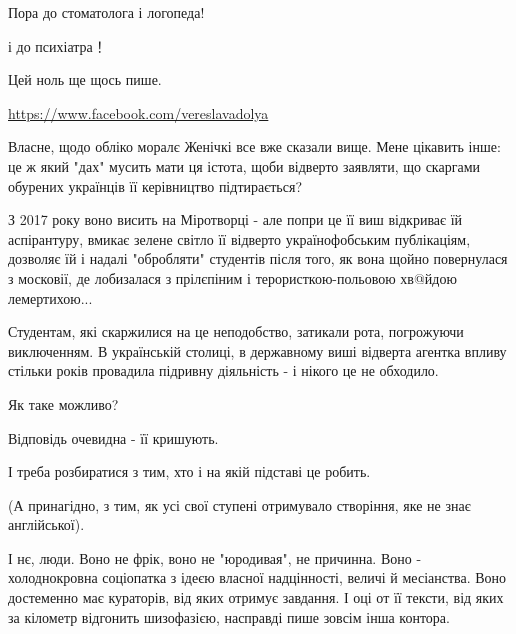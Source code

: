 \begin{itemize}

Пора до стоматолога і логопеда!

\begin{itemize}

і до психіатра！
\end{itemize}


Цей ноль ще щось пише.

\url{https://www.facebook.com/vereslavadolya}\par

Власне, щодо обліко моралє Женічкі все вже сказали вище. Мене цікавить інше: це
ж який "дах" мусить мати ця істота, щоби відверто заявляти, що скаргами
обурених українців її керівництво підтирається? 

З 2017 року воно висить на Міротворці - але попри це її виш відкриває їй
аспірантуру, вмикає зелене світло її відверто українофобським публікаціям,
дозволяє їй і надалі "обробляти" студентів після того, як вона щойно
повернулася з московії, де лобизалася з прілєпіним і терористкою-польовою
хв@йдою лемертихою... 

Студентам, які скаржилися на це неподобство, затикали рота, погрожуючи
виключенням. В українській столиці, в державному виші відверта агентка впливу
стільки років провадила підривну діяльність - і нікого це не обходило.

Як таке можливо?

Відповідь очевидна - її кришують.

І треба розбиратися з тим, хто і на якій підставі це робить.

(А принагідно, з тим, як усі свої ступені отримувало створіння, яке не знає англійської).

І нє, люди. Воно не фрік, воно не "юродивая", не причинна. Воно - холоднокровна
соціопатка з ідеєю власної надцінності, величі й месіанства. Воно достеменно
має кураторів, від яких отримує завдання. І оці от її тексти, від яких за
кілометр відгонить шизофазією, насправді пише зовсім інша контора.


\end{itemize}
